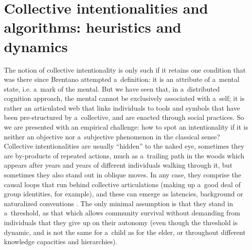 \section*{Collective intentionalities and algorithms: heuristics and dynamics}
The notion of collective intentionality is only such if it retains one condition that was there since Brentano attempted a~definition: it is an attribute of a~mental state, i.e. a~mark of the mental. But we have seen that, in a~distributed cognition approach, the mental cannot be exclusively associated with a~self; it is rather an articulated web that links individuals to tools and symbols that have been pre-structured by a~collective, and are enacted through social practices. So we are presented with an empirical challenge: how to spot an intentionality if it is neither an objective nor a~subjective phenomenon in the classical sense? Collective intentionalities are usually ``hidden'' to the naked eye, sometimes they are by-products of repeated actions, much as a~trailing path in the woods which appears after years and years of different individuals walking through it, but sometimes they also stand out in oblique moves. In any case, they comprise the causal loops that run behind collective articulations (making up a~good deal of group identities, for example), and these can emerge as latencies, background or naturalized conventions
\parencites[a specialized analysis in][]{chant_individual_2014}[in relation to this topic see also][]{toscano_intentionalities_nodate}. %
 The only minimal assumption is that they stand in a~threshold, as that which allows community survival without demanding from individuals that they give up on their autonomy (even though the threshold is dynamic, and is not the same for a~child as for the elder, or throughout different knowledge capacities and hierarchies).

